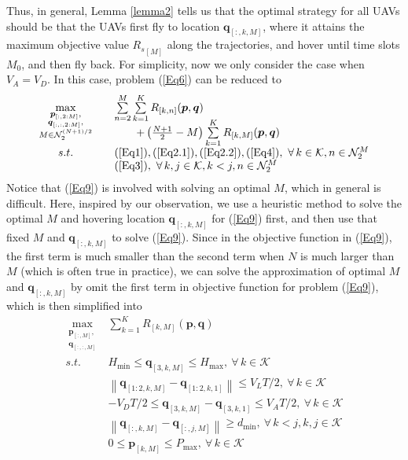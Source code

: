 \documentclass[10pt,final,conference]{IEEEtran}
\begin{document}
Thus, in general, Lemma \ref{lemma2} tells us that the optimal strategy for all UAVs should be that the UAVs first fly to location $\boldsymbol{q}_{[:,k,M]}$, where it attains the maximum objective value ${R_s}_{[M]}$ along the trajectories, and hover until time slots $M_0$, and then fly back. For simplicity, now we only consider the case when $V_A=V_D$. In this case, problem (\ref{Eq6}) can be reduced to
\begin{equation}\label{Eq9}
	\begin{array}{cll}
		\max\limits_{\substack{\boldsymbol{p}_{[:,2:M]}, \\ \boldsymbol{q}_{[:,:,2:M]}, \\ M\in\mathcal{N}_2^{(N+1)/2}}}\quad & \sum\limits_{n=2}^{M}\sum\limits_{k=1}^K R_{[k,n]}(\boldsymbol{p},\boldsymbol{q}) \\[-20pt] &\qquad+\left(\frac{N+1}{2}-M\right)\sum\limits_{k=1}^KR_{[k,M]}(\boldsymbol{p},\boldsymbol{q}) \\
		s.t. \quad & (\ref{Eq1}),(\ref{Eq2.1}),(\ref{Eq2.2}),(\ref{Eq4}),\ \forall\,k\in\mathcal{K},n\in\mathcal{N}_2^M \\
		& (\ref{Eq3}),\ \forall\,k,j\in\mathcal{K},k<j,n\in\mathcal{N}_2^M
	\end{array}
\end{equation}
Notice that (\ref{Eq9}) is involved with solving an optimal $M$, which in general is difficult. Here, inspired by our observation, we use a heuristic method to solve the optimal $M$ and hovering location $\boldsymbol{q}_{[:,k,M]}$ for (\ref{Eq9}) first, and then use that fixed $M$ and $\boldsymbol{q}_{[:,k,M]}$ to solve (\ref{Eq9}). Since in the objective function in (\ref{Eq9}), the first term is much smaller than the second term when $N$ is much larger than $M$ (which is often true in practice), we can solve the approximation of optimal $M$ and $\boldsymbol{q}_{[:,k,M]}$ by omit the first term in objective function for problem (\ref{Eq9}), which is then simplified into
\begin{equation}\label{Eq10}
	\begin{array}{cl}
		\max\limits_{\substack{\boldsymbol{p}_{[:,M]}, \\ \boldsymbol{q}_{[:,:,M]}}} & \sum\limits_{k=1}^KR_{[k,M]}(\boldsymbol{p},\boldsymbol{q}) \\ 
		s.t. \quad & H_{\min}\leq\boldsymbol{q}_{[3,k,M]}\leq H_{\max}, \ \forall\,k\in\mathcal{K} \\
		& \left\lVert\boldsymbol{q}_{[1:2,k,M]}-\boldsymbol{q}_{[1:2,k,1]}\right\rVert\leq V_LT/2,\ \forall\,k\in\mathcal{K} \\
		& -V_DT/2\leq\boldsymbol{q}_{[3,k,M]}-\boldsymbol{q}_{[3,k,1]}\leq V_AT/2,\ \forall\,k\in\mathcal{K} \\
		&	\left\lVert\boldsymbol{q}_{[:,k,M]}-\boldsymbol{q}_{[:,j,M]}\right\rVert\geq d_{\min},\ \forall\,k<j,k,j\in\mathcal{K} \\
		& 0\leq \boldsymbol{p}_{[k,M]}\leq P_{\max},\  \forall\,k\in\mathcal{K}
	\end{array}
\end{equation}
\end{document}
